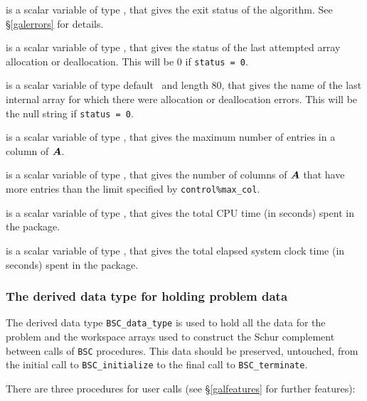 \documentclass{galahad}
\newcommand{\packagename}{BSC}
\begin{document}
\begin{description}

 is a scalar variable of type \integer, that gives the
exit status of the algorithm. 
See \S\ref{galerrors} 
for details.

 is a scalar variable of type \integer, that gives
the status of the last attempted array allocation or deallocation.
This will be 0 if {\tt status = 0}.

 is a scalar variable of type default \character\
and length 80, that  gives the name of the last internal array 
for which there were allocation or deallocation errors.
This will be the null string if {\tt status = 0}. 

 is a scalar variable of type \integer, that gives
 the maximum number of entries in a column of ${\bm{A}}$.

 is a scalar variable of type \integer, that 
 gives the number of columns of ${\bm{A}}$ that have more entries than the limit
 specified by {\tt control\%max\_col}.

 is a scalar variable of type \realdp, that gives
 the total CPU time (in seconds) spent in the package.

 is a scalar variable of type \realdp, that gives
 the total elapsed system clock time (in seconds) spent in the package.

\end{description}


\subsubsection{The derived data type for holding problem data}\label{typedata}
The derived data type
{\tt \packagename\_data\_type} 
is used to hold all the data for the problem and the workspace arrays 
used to construct the Schur complement between calls of 
{\tt \packagename} procedures. 
This data should be preserved, untouched, from the initial call to 
{\tt \packagename\_initialize}
to the final call to
{\tt \packagename\_terminate}.


\galarguments
There are three procedures for user calls
(see \S\ref{galfeatures} for further features): 
\end{document}
